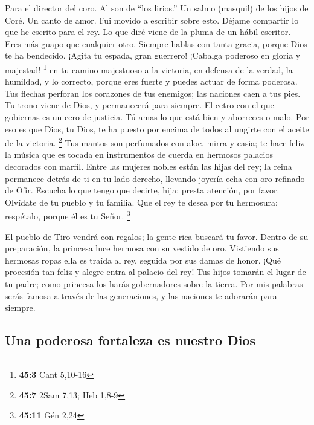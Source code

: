 Para el director del coro. Al son de ``los lirios.'' Un salmo (masquil)
de los hijos de Coré. Un canto de amor.  Fui movido a
escribir sobre esto. Déjame compartir lo que he escrito para el rey. Lo
que diré viene de la pluma de un hábil escritor.  Eres más
guapo que cualquier otro. Siempre hablas con tanta gracia, porque Dios
te ha bendecido.  ¡Agita tu espada, gran guerrero! ¡Cabalga
poderoso en gloria y majestad! \footnote{\textbf{45:3} Cant 5,10-16}
 en tu camino majestuoso a la victoria, en defensa de la
verdad, la humildad, y lo correcto, porque eres fuerte y puedes actuar
de forma poderosa.  Tus flechas perforan los corazones de
tus enemigos; las naciones caen a tus pies.  Tu trono viene
de Dios, y permanecerá para siempre. El cetro con el que gobiernas es un
cero de justicia.  Tú amas lo que está bien y aborreces o
malo. Por eso es que Dios, tu Dios, te ha puesto por encima de todos al
ungirte con el aceite de la victoria. \footnote{\textbf{45:7} 2Sam 7,13;
  Heb 1,8-9}  Tus mantos son perfumados con aloe, mirra y
casia; te hace feliz la música que es tocada en instrumentos de cuerda
en hermosos palacios decorados con marfil.  Entre las
mujeres nobles están las hijas del rey; la reina permanece detrás de ti
en tu lado derecho, llevando joyería echa con oro refinado de Ofir.
 Escucha lo que tengo que decirte, hija; presta atención,
por favor. Olvídate de tu pueblo y tu familia.  Que el rey
te desea por tu hermosura; respétalo, porque él es tu Señor. \footnote{\textbf{45:11}
  Gén 2,24}

 El pueblo de Tiro vendrá con regalos; la gente rica
buscará tu favor.  Dentro de su preparación, la princesa
luce hermosa con su vestido de oro.  Vistiendo sus hermosas
ropas ella es traída al rey, seguida por sus damas de honor.
 ¡Qué procesión tan feliz y alegre entra al palacio del
rey!  Tus hijos tomarán el lugar de tu padre; como princesa
los harás gobernadores sobre la tierra.  Por mis palabras
serás famosa a través de las generaciones, y las naciones te adorarán
para siempre.

\hypertarget{una-poderosa-fortaleza-es-nuestro-dios}{%
\subsection{Una poderosa fortaleza es nuestro
Dios}\label{una-poderosa-fortaleza-es-nuestro-dios}}

